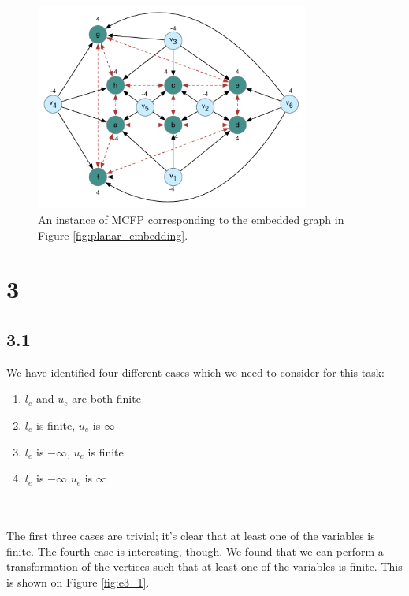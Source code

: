 \documentclass[12pt]{article}
\begin{document}
\begin{figure}[h]
  \centering
    \includegraphics[width=0.8\textwidth]{figures/e2_5}
  \caption{An instance of MCFP corresponding to the embedded graph in Figure \ref{fig:planar_embedding}.}
  \label{fig:mcfp_instance}
\end{figure}

\section{3}
\subsection{3.1}
We have identified four different cases which we need to consider for this task:
\begin{enumerate}
    \item $l_e$ and $u_e$ are both finite
    \item $l_e$ is finite, $u_e$ is $\infty$
    \item $l_e$ is $-\infty$, $u_e$ is finite
    \item $l_e$ is $-\infty$ $u_e$ is $\infty$
\end{enumerate}~\\
\\
The first three cases are trivial; it's clear that at least one of the variables is finite. The fourth case is interesting, though. We found that we can perform a transformation of the vertices such that at least one of the variables is finite. This is shown on Figure \ref{fig:e3_1}.
\end{document}
